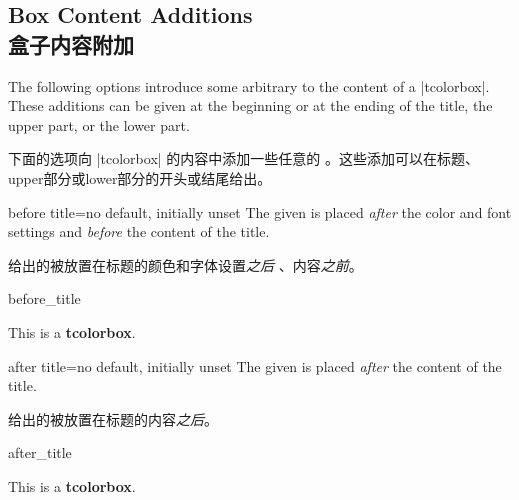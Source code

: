 \setcounter{section}{4}
\setcounter{subsection}{10}
\setcounter{subsubsection}{0}

\subsection{Box Content Additions\\盒子内容附加}\label{subsec:contentadditions}

The following options introduce some arbitrary  to the content
of a |tcolorbox|. These additions can be given at the beginning or at the ending
of the title, the upper part, or the lower part.

下面的选项向 |tcolorbox| 的内容中添加一些任意的 。这些添加可以在标题、upper部分或lower部分的开头或结尾给出。


\begin{docTcbKey}{before title}{=}{no default, initially unset}
The given  is placed \emph{after} the color and font settings
and \emph{before} the content of the title.

给出的被放置在标题的颜色和字体设置\emph{之后} 、内容\emph{之前}。
\begin{exdispExample}{before_title}

\begin{tcolorbox}[title=My title]
This is a \textbf{tcolorbox}.
\end{tcolorbox}
\end{exdispExample}
\end{docTcbKey}


\begin{docTcbKey}{after title}{=}{no default, initially unset}
The given  is placed \emph{after} the content of the title.

给出的被放置在标题的内容\emph{之后}。
\begin{exdispExample}{after_title}

\begin{tcolorbox}[title=My title]
This is a \textbf{tcolorbox}.
\end{tcolorbox}
\end{exdispExample}
\end{docTcbKey}




